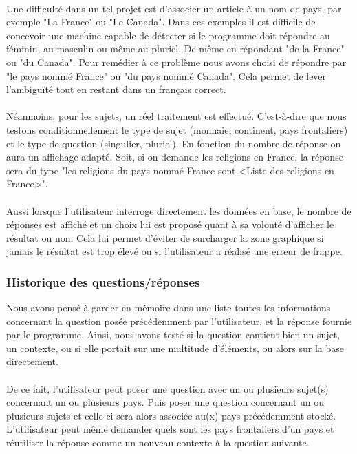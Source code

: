 \documentclass[11pt,a4paper]{article}
\begin{document}
\paragraph{}Une difficulté dans un tel projet est d'associer un article à un nom de pays, par exemple "La France" ou "Le Canada". Dans ces exemples il est difficile de concevoir une machine capable de détecter si le programme doit répondre au féminin, au masculin ou même au pluriel. De même en répondant "de la France" ou "du Canada". Pour remédier à ce problème nous avons choisi de répondre par "le pays nommé France" ou "du pays nommé Canada". Cela permet de lever l'ambiguïté tout en restant dans un français correct. 
\paragraph{}Néanmoins, pour les sujets, un réel traitement est effectué. C'est-à-dire que nous testons conditionnellement le type de sujet (monnaie, continent, pays frontaliers) et le type de question (singulier, pluriel). En fonction du nombre de réponse on aura un affichage adapté. Soit, si on demande les religions en France, la réponse sera du type "les religions du pays nommé France sont <Liste des religions en France>". 
\paragraph{}Aussi lorsque l'utilisateur interroge directement les données en base, le nombre de réponses est affiché et un choix lui est proposé quant à sa volonté d'afficher le résultat ou non. Cela lui permet d'éviter de surcharger la zone graphique si jamais le résultat est trop élevé ou si l'utilisateur a réalisé une erreur de frappe.

\subsubsection{Historique des questions/réponses}
Nous avons pensé à garder en mémoire dans une liste toutes les informations concernant la question posée précédemment par l'utilisateur, et la réponse fournie par le programme. Ainsi, nous avons testé si la question contient bien un sujet, un contexte, ou si elle portait sur une multitude d'éléments, ou alors sur la base directement. 
\paragraph{}De ce fait, l'utilisateur peut poser une question avec un ou plusieurs sujet(s) concernant un ou plusieurs pays. Puis poser une question concernant un ou plusieurs sujets et celle-ci sera alors associée au(x) pays précédemment stocké. L'utilisateur peut même demander quels sont les pays frontaliers d'un pays et réutiliser la réponse comme un nouveau contexte à la question suivante.
\end{document}
